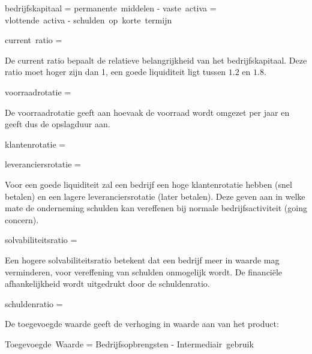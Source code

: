 \documentclass[../../samenvatting.tex]{subfiles}
\begin{document}
\begin{equate}
bedrijfskapitaal = permanente\ middelen - vaste\ activa = \\
vlottende\ activa - schulden\ op\ korte\ termijn
\end{equate}

\begin{equate}
    current\ ratio = 
\end{equate}

De current ratio bepaalt de relatieve belangrijkheid van het bedrijfskapitaal. Deze ratio moet hoger zijn dan 1, een goede liquiditeit ligt tussen $1.2$ en $1.8$.

\begin{equate}
    voorraadrotatie = 
\end{equate}

De voorraadrotatie geeft aan hoevaak de voorraad wordt omgezet per jaar en geeft dus de opslagduur aan.

\begin{equate}
    klantenrotatie = 
\end{equate}

\begin{equate}
    leveranciersrotatie = 
\end{equate}

Voor een goede liquiditeit zal een bedrijf een hoge klantenrotatie hebben (snel betalen) en een lagere leveranciersrotatie (later betalen). Deze geven aan in welke mate de onderneming schulden kan vereffenen bij normale bedrijfsactiviteit (going concern).

\begin{equate}
    solvabiliteitsratio = 
\end{equate}

Een hogere solvabiliteitsratio betekent dat een bedrijf meer in waarde mag verminderen, voor vereffening van schulden onmogelijk wordt. De financiële afhankelijkheid wordt uitgedrukt door de schuldenratio.

\begin{equate}
    schuldenratio = 
\end{equate}


De toegevoegde waarde geeft de verhoging in waarde aan van het product:
\begin{equate}
    Toegevoegde\ Waarde = Bedrijfsopbrengsten - Intermediair\ gebruik
\end{equate}
\end{document}
